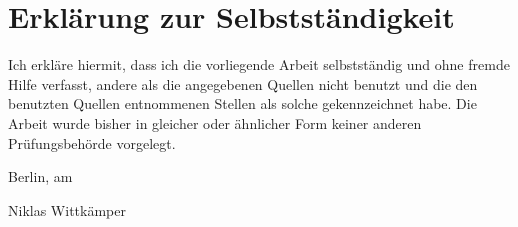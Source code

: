 
\chapter*{Erklärung zur Selbstständigkeit}

\noindent
Ich erkl\"are hiermit, dass ich die vorliegende Arbeit selbstst\"andig und ohne fremde Hilfe verfasst, 
andere als die angegebenen Quellen nicht benutzt und die den benutzten Quellen entnommenen Stellen als 
solche gekennzeichnet habe. Die Arbeit wurde bisher in gleicher oder \"ahnlicher Form keiner anderen 
Pr\"ufungsbeh\"orde vorgelegt.
\par
\vspace{10mm}
\noindent
Berlin, am \formatdate{\value{@abgabetag}}{\value{@abgabemonat}}{\value{@abgabejahr}}
\par
\vspace{12mm}
\noindent
Niklas Wittk\"amper

